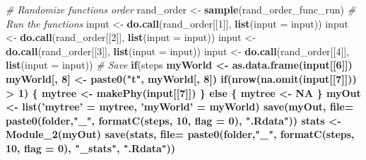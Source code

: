 \documentclass[]{book}
\newenvironment{Shaded}{\begin{snugshade}}{\end{snugshade}}
\newcommand{\KeywordTok}[1]{\textcolor[rgb]{0.13,0.29,0.53}{\textbf{{#1}}}}
\newcommand{\DataTypeTok}[1]{\textcolor[rgb]{0.13,0.29,0.53}{{#1}}}
\newcommand{\DecValTok}[1]{\textcolor[rgb]{0.00,0.00,0.81}{{#1}}}
\newcommand{\StringTok}[1]{\textcolor[rgb]{0.31,0.60,0.02}{{#1}}}
\newcommand{\CommentTok}[1]{\textcolor[rgb]{0.56,0.35,0.01}{\textit{{#1}}}}
\newcommand{\OtherTok}[1]{\textcolor[rgb]{0.56,0.35,0.01}{{#1}}}
\newcommand{\ControlFlowTok}[1]{\textcolor[rgb]{0.13,0.29,0.53}{\textbf{{#1}}}}
\newcommand{\OperatorTok}[1]{\textcolor[rgb]{0.81,0.36,0.00}{\textbf{{#1}}}}
\newcommand{\NormalTok}[1]{{#1}}
\theoremstyle{definition}
\theoremstyle{definition}
\theoremstyle{definition}
\theoremstyle{remark}
\begin{document}
\begin{Shaded}
\begin{Highlighting}[]
{{{    \CommentTok{# Randomize functions order}
\NormalTok{    rand_order <-}\StringTok{ }\KeywordTok{sample}\NormalTok{(rand_order_func_run)}
    \CommentTok{# Run the functions}
\NormalTok{    input <-}\StringTok{ }\KeywordTok{do.call}\NormalTok{(rand_order[[}\DecValTok{1}\NormalTok{]], }\KeywordTok{list}\NormalTok{(}\DataTypeTok{input =}\NormalTok{ input))}
\NormalTok{    input <-}\StringTok{ }\KeywordTok{do.call}\NormalTok{(rand_order[[}\DecValTok{2}\NormalTok{]], }\KeywordTok{list}\NormalTok{(}\DataTypeTok{input =}\NormalTok{ input))}
\NormalTok{    input <-}\StringTok{ }\KeywordTok{do.call}\NormalTok{(rand_order[[}\DecValTok{3}\NormalTok{]], }\KeywordTok{list}\NormalTok{(}\DataTypeTok{input =}\NormalTok{ input))}
\NormalTok{    input <-}\StringTok{ }\KeywordTok{do.call}\NormalTok{(rand_order[[}\DecValTok{4}\NormalTok{]], }\KeywordTok{list}\NormalTok{(}\DataTypeTok{input =}\NormalTok{ input))}
    \CommentTok{# Save}
    \ControlFlowTok{if}\NormalTok{(steps }\OperatorTok{%
\NormalTok{      myWorld <-}\StringTok{ }\KeywordTok{as.data.frame}\NormalTok{(input[[}\DecValTok{6}\NormalTok{]])}
\NormalTok{      myWorld[, }\DecValTok{8}\NormalTok{] <-}\StringTok{ }\KeywordTok{paste0}\NormalTok{(}\StringTok{"t"}\NormalTok{, myWorld[, }\DecValTok{8}\NormalTok{])}
      \ControlFlowTok{if}\NormalTok{(}\KeywordTok{nrow}\NormalTok{(}\KeywordTok{na.omit}\NormalTok{(input[[}\DecValTok{7}\NormalTok{]])) }\OperatorTok{>}\StringTok{ }\DecValTok{1}\NormalTok{) \{}
\NormalTok{        mytree <-}\StringTok{ }\KeywordTok{makePhy}\NormalTok{(input[[}\DecValTok{7}\NormalTok{]])}
\NormalTok{      \} }\ControlFlowTok{else}\NormalTok{ \{}
\NormalTok{        mytree <-}\StringTok{ }\OtherTok{NA}
\NormalTok{      \}}
\NormalTok{      myOut <-}\StringTok{ }\KeywordTok{list}\NormalTok{(}\StringTok{'mytree'}\NormalTok{ =}\StringTok{ }\NormalTok{mytree, }\StringTok{'myWorld'}\NormalTok{ =}\StringTok{ }\NormalTok{myWorld)}
      \KeywordTok{save}\NormalTok{(myOut, }\DataTypeTok{file=} \KeywordTok{paste0}\NormalTok{(folder,}\StringTok{"_"}\NormalTok{, }\KeywordTok{formatC}\NormalTok{(steps, }\DecValTok{10}\NormalTok{, }\DataTypeTok{flag =} \DecValTok{0}\NormalTok{), }\StringTok{".Rdata"}\NormalTok{))}
\NormalTok{      stats <-}\StringTok{ }\KeywordTok{Module_2}\NormalTok{(myOut)}
      \KeywordTok{save}\NormalTok{(stats, }\DataTypeTok{file=} \KeywordTok{paste0}\NormalTok{(folder,}\StringTok{"_"}\NormalTok{, }\KeywordTok{formatC}\NormalTok{(steps, }\DecValTok{10}\NormalTok{, }\DataTypeTok{flag =} \DecValTok{0}\NormalTok{),}
                               \StringTok{"_stats"}\NormalTok{, }\StringTok{".Rdata"}\NormalTok{))}
}}}}
\end{Highlighting}
\end{Shaded}
\end{document}

